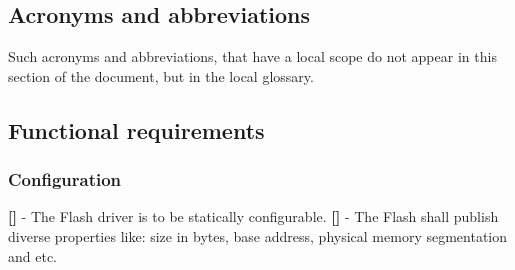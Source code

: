 \subsection{Acronyms and abbreviations}
Such acronyms and abbreviations, that have a local scope do not appear in this section of the document, but in the local glossary.
\subsection{Functional requirements}
\subsubsection{Configuration}
{\bf []} - The \mbox{Flash} driver is to be statically configurable.\newline
\newline
{\bf []} - The \mbox{Flash} shall publish diverse properties like: size in bytes, base address, physical memory segmentation and etc.

